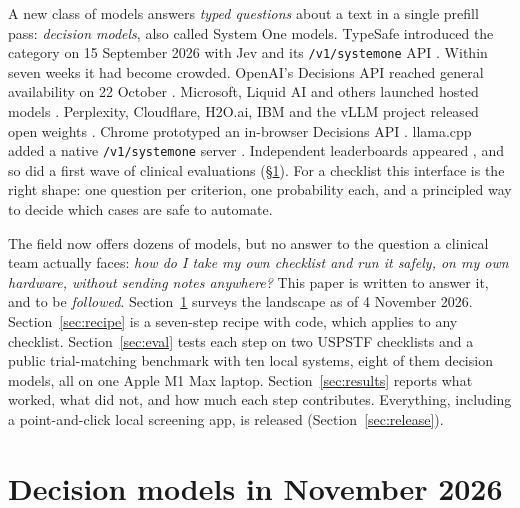 \documentclass[11pt]{article}
\begin{document}
A new class of models answers \emph{typed questions} about a text in a single prefill pass: \emph{decision models}, also called System One models.
TypeSafe introduced the category on 15 September 2026 with Jev and its \texttt{/v1/systemone} API \citep{typesafe2026,typesafe_jev_docs}.
Within seven weeks it had become crowded.
OpenAI's Decisions API reached general availability on 22 October \citep{openai_decisions}.
Microsoft, Liquid AI and others launched hosted models \citep{ms_decision1,liquid_d1}.
Perplexity, Cloudflare, H2O.ai, IBM and the vLLM project released open weights \citep{pplx_decider_v12,cloudflare_clef,h2o_lightning4b,granite_switch,vllmsr_decision2}.
Chrome prototyped an in-browser Decisions API \citep{chrome_decisions}.
llama.cpp added a native \texttt{/v1/systemone} server \citep{llamacpp_systemone}.
Independent leaderboards appeared \citep{decision_index,jevbench,aa_decision_index}, and so did a first wave of clinical evaluations (\S\ref{sec:models}).
For a checklist this interface is the right shape: one question per criterion, one probability each, and a principled way to decide which cases are safe to automate.

The field now offers dozens of models, but no answer to the question a clinical team actually faces: \emph{how do I take my own checklist and run it safely, on my own hardware, without sending notes anywhere?}
This paper is written to answer it, and to be \emph{followed}.
Section~\ref{sec:models} surveys the landscape as of 4 November 2026.
Section~\ref{sec:recipe} is a seven-step recipe with code, which applies to any checklist.
Section~\ref{sec:eval} tests each step on two USPSTF checklists and a public trial-matching benchmark with ten local systems, eight of them decision models, all on one Apple M1 Max laptop.
Section~\ref{sec:results} reports what worked, what did not, and how much each step contributes.
Everything, including a point-and-click local screening app, is released (Section~\ref{sec:release}).

\section{Decision models in November 2026}
\label{sec:models}
\end{document}

